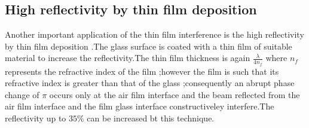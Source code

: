 \subsection{High reflectivity by thin film deposition}
Another important application of the thin film interference is the high reflectivity by thin film deposition .The glass surface is coated with a thin film of suitable material to increase the reflectivity.The thin film thickness is again $\frac{\lambda}{4n_f}$ where $n_f$ represents the refractive index of the film ;however the film is such that its refractive index is greater than that of the glass ;consequently an abrupt phase change of $\pi$ occurs only at the air film interface  and the beam reflected from the air film interface and the film glass interface constructiveley interfere.The reflectivity up to $35\%$ can be increased bt this technique.
